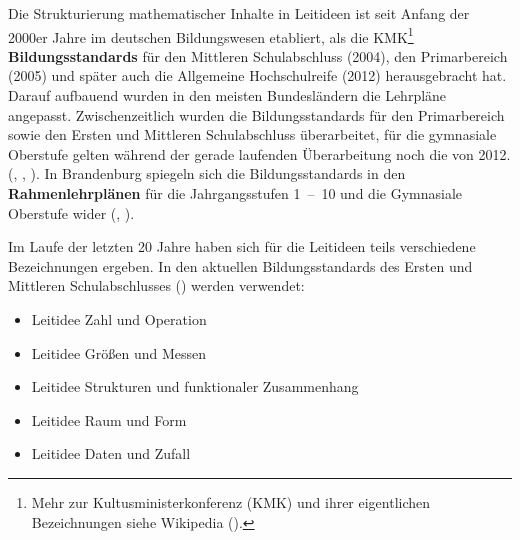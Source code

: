 \documentclass[
]{scrbook}
\providecommand{\tightlist}{%
  \setlength{\itemsep}{0pt}\setlength{\parskip}{0pt}}
\theoremstyle{definition}
\theoremstyle{definition}
\theoremstyle{definition}
\theoremstyle{definition}
\theoremstyle{remark}
\begin{document}
Die Strukturierung mathematischer Inhalte in Leitideen ist seit Anfang der 2000er Jahre im deutschen Bildungswesen etabliert, als die KMK\footnote{Mehr zur Kultusministerkonferenz (KMK) und ihrer eigentlichen Bezeichnungen siehe Wikipedia ().} \textbf{Bildungsstandards} für den Mittleren Schulabschluss (2004), den Primarbereich (2005) und später auch die Allgemeine Hochschulreife (2012) herausgebracht hat. Darauf aufbauend wurden in den meisten Bundesländern die Lehrpläne angepasst.
Zwischenzeitlich wurden die Bildungsstandards für den Primarbereich sowie den Ersten und Mittleren Schulabschluss überarbeitet, für die gymnasiale Oberstufe gelten während der gerade laufenden Überarbeitung noch die von 2012. (, , ).
In Brandenburg spiegeln sich die Bildungsstandards in den \textbf{Rahmenlehrplänen} für die Jahrgangsstufen 1~--~10 und die Gymnasiale Oberstufe wider (, ).

Im Laufe der letzten 20 Jahre haben sich für die Leitideen teils verschiedene Bezeichnungen ergeben. In den aktuellen Bildungsstandards des Ersten und Mittleren Schulabschlusses () werden verwendet:

\begin{itemize}
\tightlist
\item
  Leitidee Zahl und Operation
\item
  Leitidee Größen und Messen
\item
  Leitidee Strukturen und funktionaler Zusammenhang
\item
  Leitidee Raum und Form
\item
  Leitidee Daten und Zufall
\end{itemize}
\end{document}
